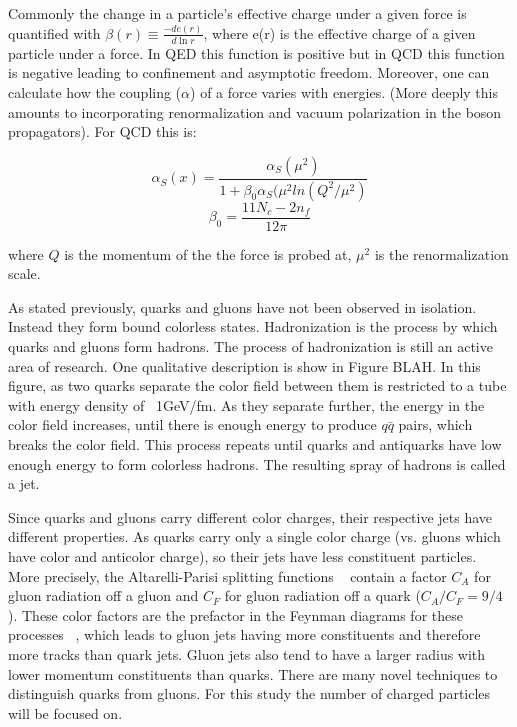 Commonly the change in a particle's effective charge under a given force is quantified with  $\beta(r) \equiv \frac{-de(r)}{d\ln r}$, where e(r) is the effective charge of a given particle under a force. In QED this function is positive but in QCD this function is negative leading to confinement and asymptotic freedom. Moreover, one can calculate how the coupling ($\alpha$) of a force varies with energies. (More deeply this amounts to incorporating renormalization and vacuum polarization in the boson propagators). For QCD this is:

\begin{equation}
\alpha_{S}(x) = \frac{\alpha_{S}(\mu^{2})}{1+\beta_{0}\alpha_{S}(\mu^{2}ln(Q^{2}/\mu^{2})}
\end{equation}
\begin{equation}
\beta_{0} = \frac{11N_{c}-2n_{f}}{12\pi}
\end{equation}

where $Q$ is the momentum of the the force is probed at, $\mu^{2}$ is the renormalization scale.

As stated previously, quarks and gluons have not been observed in isolation. Instead they form bound colorless states. Hadronization is the process by which quarks and gluons form hadrons. The process of hadronization is still an active area of research. One qualitative description is show in Figure BLAH. In this figure, as two quarks separate the color field between them is restricted to a tube with energy density of ~1GeV/fm. As they separate further, the energy in the color field increases, until there is enough energy to produce $q\bar{q}$ pairs, which breaks the color field. This process repeats until quarks and antiquarks have low enough energy to form colorless hadrons. The resulting spray of hadrons is called a jet.

Since quarks and gluons carry different color charges, their respective jets have different properties. As quarks carry only a single color charge (vs. gluons which have color and anticolor charge), so their jets have less constituent particles. More precisely, the Altarelli-Parisi splitting functions ~\cite{altarelli} contain a factor $C_{A}$ for gluon radiation off a gluon and $C_{F}$ for gluon radiation off a quark ($C_{A}/C_{F} = 9/4$). These color factors are the prefactor in the Feynman diagrams for these processes ~\cite{colorfactor}, which leads to gluon jets having more constituents and therefore more tracks than quark jets. Gluon jets also tend to have a larger radius with lower momentum constituents than quarks. There are many novel techniques to distinguish quarks from gluons. For this study the number of charged particles will be focused on.  

